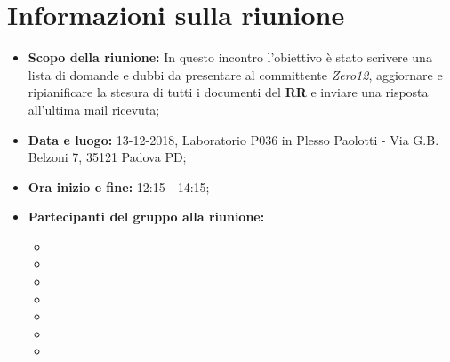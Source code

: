 \clearpage
\section{Informazioni sulla riunione}
\begin{itemize}
	\item \textbf {Scopo della riunione:} In questo incontro l'obiettivo è stato scrivere una lista di domande e dubbi da presentare al committente \emph{Zero12}, aggiornare e ripianificare la stesura di tutti i documenti del \textbf{RR} e inviare una risposta all'ultima mail ricevuta;
	
	\item \textbf {Data e luogo:} 13-12-2018, Laboratorio P036 in Plesso Paolotti - Via G.B. Belzoni 7, 35121 Padova PD;
	
	\item \textbf {Ora inizio e fine:} 12:15 - 14:15;
	
	\item \textbf {Partecipanti del gruppo alla riunione:} 
		 \begin{itemize}
			\item \sonia
			\item \luca
			\item \matteo
			\item \pardeep
			\item \alberto
			\item \alessandro
			\item \andrea
		\end{itemize}
\end{itemize}